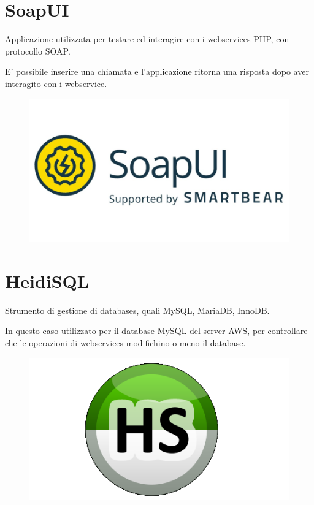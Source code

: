\section{SoapUI}
\begin{flushleft}
	Applicazione utilizzata per testare ed interagire con i webservices PHP, con protocollo SOAP.
	
	E' possibile inserire una chiamata e l'applicazione ritorna una risposta dopo aver interagito con i webservice.
	
\end{flushleft}
\begin{figure}[!h] 
	\centering
	\includegraphics[scale = 1]{immagini/tecnologie/soapui}
\end{figure}
\section{HeidiSQL}
\begin{flushleft}
	Strumento di gestione di databases, quali MySQL, MariaDB, InnoDB.
	
	In questo caso utilizzato per il database MySQL del server AWS, per controllare che le operazioni di webservices modifichino o meno il database.
\end{flushleft}
\begin{figure}[!h] 
	\centering
	\includegraphics[scale = 0.5]{immagini/tecnologie/HeidiSQL}
\end{figure}
